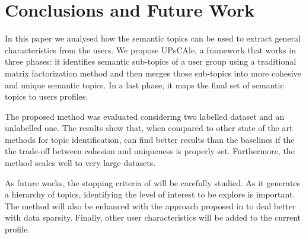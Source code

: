 \section{Conclusions and Future Work}

In this paper we analysed how the semantic topics can be used to extract
general characteristics from the users. 
We propose UPsCAle, a framework that works in three phases: it
identifies semantic sub-topics of a user group using a traditional matrix
factorization method and then merges those sub-topics into more cohesive
and unique semantic topics. In a last phase, it maps the final set of semantic
topics to users profiles.

The proposed method was evaluated considering two labelled dataset and an
unlabelled one. The results show that, when compared to other state of the art
methods for topic identification, \method can find better results than the baselines if the the trade-off between cohesion and uniqueness is
properly set. Furthermore, the method scales well to very large datasets.

As future works, the stopping criteria of \method will be carefully studied. As it generates a hierarchy of topics, identifying the level of interest to be explore is important. The method will also be enhanced with the approach proposed in \cite{cheng:2013} to deal better with data sparsity. Finally, other user characteristics will be added to the current profile.

